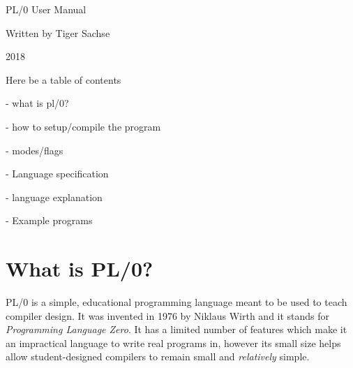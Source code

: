 \documentclass{article}
\begin{document}
\begin{center}
{\Huge
    PL/0 User Manual
}

{\Large 
    Written by Tiger Sachse

    2018
}
\end{center}

\pagebreak
Here be a table of contents

- what is pl/0?

- how to setup/compile the program

- modes/flags

- Language specification

- language explanation

- Example programs

\pagebreak

\section*{What is PL/0?}
PL/0 is a simple, educational programming language meant to be used to teach compiler
design. It was invented in 1976 by Niklaus Wirth and it stands for
\textit{Programming Language Zero}. It has a limited number of features which make
it an impractical language to write real programs in, however its small size helps
allow student-designed compilers to remain small and \textit{relatively} simple.
\end{document}
